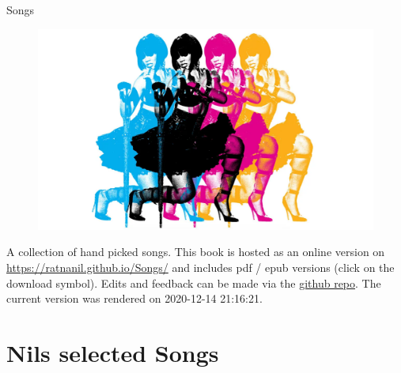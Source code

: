 \documentclass[
]{book}
\author{}
\date{\vspace{-2.5em}}
\begin{document}

\begin{titlepage}
\begin{center}
  

\end{center}
\vspace{1.5cm}
\begin{center}

{\LARGE Songs}

\end{center}
 \vspace{1cm}

\begin{figure}[htbp]
  \centering
  \includegraphics[width=1\textwidth]{misc/title.png}
  \label{titelbild}
\end{figure}

\begin{center}
\textbf{}


\end{center} 

\vspace{1.0cm}


\end{titlepage}

{
\setcounter{tocdepth}{1}
\tableofcontents
}
A collection of hand picked songs. This book is hosted as an online version on \url{https://ratnanil.github.io/Songs/} and includes pdf / epub versions (click on the download symbol). Edits and feedback can be made via the \href{https://github.com/ratnanil/songs}{github repo}. The current version was rendered on 2020-12-14 21:16:21.

\hypertarget{nils-selected-songs}{%
\chapter{Nils selected Songs}\label{nils-selected-songs}}
\end{document}
